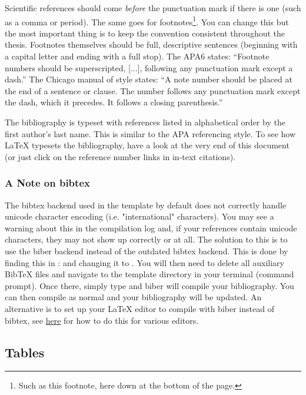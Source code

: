Scientific references should come \emph{before} the punctuation mark if there is one (such as a comma or period). The same goes for footnotes\footnote{Such as this footnote, here down at the bottom of the page.}. You can change this but the most important thing is to keep the convention consistent throughout the thesis. Footnotes themselves should be full, descriptive sentences (beginning with a capital letter and ending with a full stop). The APA6 states: \enquote{Footnote numbers should be superscripted, [...], following any punctuation mark except a dash.} The Chicago manual of style states: \enquote{A note number should be placed at the end of a sentence or clause. The number follows any punctuation mark except the dash, which it precedes. It follows a closing parenthesis.}

The bibliography is typeset with references listed in alphabetical order by the first author's last name. This is similar to the APA referencing style. To see how \LaTeX{} typesets the bibliography, have a look at the very end of this document (or just click on the reference number links in in-text citations).

\subsubsection{A Note on bibtex}

The bibtex backend used in the template by default does not correctly handle unicode character encoding (i.e. "international" characters). You may see a warning about this in the compilation log and, if your references contain unicode characters, they may not show up correctly or at all. The solution to this is to use the biber backend instead of the outdated bibtex backend. This is done by finding this in :  and changing it to . You will then need to delete all auxiliary BibTeX files and navigate to the template directory in your terminal (command prompt). Once there, simply type  and biber will compile your bibliography. You can then compile  as normal and your bibliography will be updated. An alternative is to set up your LaTeX editor to compile with biber instead of bibtex, see \href{http://tex.stackexchange.com/questions/154751/biblatex-with-biber-configuring-my-editor-to-avoid-undefined-citations/}{here} for how to do this for various editors.

\subsection{Tables}

